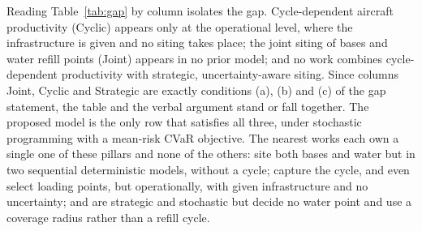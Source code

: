 Reading Table~\ref{tab:gap} by column isolates the gap. Cycle-dependent aircraft
productivity (Cyclic) appears only at the operational level, where the
infrastructure is given and no siting takes place; the joint siting of bases and
water refill points (Joint) appears in no prior model; and no work combines
cycle-dependent productivity with strategic, uncertainty-aware siting. Since
columns Joint, Cyclic and Strategic are exactly conditions (a), (b) and (c) of
the gap statement, the table and the verbal argument stand or fall together. The
proposed model is the only row that satisfies all three, under stochastic
programming with a mean-risk CVaR objective. The nearest works each own a single
one of these pillars and none of the others: \citet{maras2023} site both bases
and water but in two sequential deterministic models, without a cycle;
\citet{rodriguezbarreiro2026} capture the cycle, and even select loading points,
but operationally, with given infrastructure and no uncertainty; and
\citet{huang2025} are strategic and stochastic but decide no water point and use
a coverage radius rather than a refill cycle.
